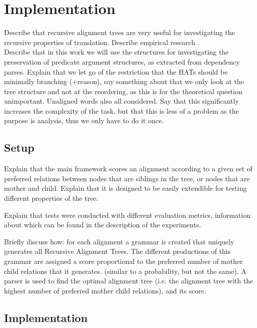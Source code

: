 \documentclass{report}
\theoremstyle{definition}
\theoremstyle{plain}
\begin{document}
\chapter{Implementation}
\label{chapter:impl}
Describe that recursive alignment trees are very useful for investigating the recursive properties of translation. Describe empirical research \cite{simaan2013hats}.\\
Describe that in this work we will use the structures for investigating the preservation of predicate argument structures, as extracted from dependency parses. Explain that we let go of the restriction that the HATs should be minimally branching (+reason), say something about that we only look at the tree structure and not at the reordering, as this is for the theoretical question unimportant.
Unaligned words also all considered. Say that this significantly increases the complexity of the task, but that this is less of a problem as the purpose is analysis, thus we only have to do it once.



\section{Setup}

Explain that the main framework scores an alignment according to a given set of preferred relations between nodes that are siblings in the tree, or nodes that are mother and child. Explain that it is designed to be easily extendible for testing different properties of the tree.

Explain that tests were conducted with different evaluation metrics, information about which can be found in the description of the experiments.

Briefly discuss how: for each alignment a grammar is created that uniquely generates all Recursive Alignment Trees. The different productions of this grammar are assigned a score proportional to the preferred number of mother child relations that it generates. (similar to a probability, but not the same). A parser is used to find the optimal alignment tree (i.e. the alignment tree with the highest number of preferred mother child relations), and its score.


\section{Implementation}
\end{document}
